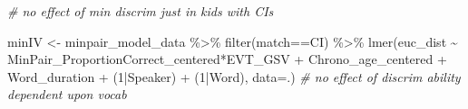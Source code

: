 \documentclass[
]{article}
\newenvironment{Shaded}{\begin{snugshade}}{\end{snugshade}}
\newcommand{\AttributeTok}[1]{\textcolor[rgb]{0.77,0.63,0.00}{#1}}
\newcommand{\CommentTok}[1]{\textcolor[rgb]{0.56,0.35,0.01}{\textit{#1}}}
\newcommand{\DecValTok}[1]{\textcolor[rgb]{0.00,0.00,0.81}{#1}}
\newcommand{\FunctionTok}[1]{\textcolor[rgb]{0.00,0.00,0.00}{#1}}
\newcommand{\NormalTok}[1]{#1}
\newcommand{\OtherTok}[1]{\textcolor[rgb]{0.56,0.35,0.01}{#1}}
\newcommand{\SpecialCharTok}[1]{\textcolor[rgb]{0.00,0.00,0.00}{#1}}
\newcommand{\StringTok}[1]{\textcolor[rgb]{0.31,0.60,0.02}{#1}}
\begin{document}
\begin{Shaded}
\begin{Highlighting}[]
\CommentTok{\# no effect of min discrim just in kids with CIs}

\NormalTok{minIV }\OtherTok{\textless{}{-}}\NormalTok{ minpair\_model\_data }\SpecialCharTok{\%\textgreater{}\%}
  \FunctionTok{filter}\NormalTok{(match}\SpecialCharTok{==}\StringTok{\textquotesingle{}CI\textquotesingle{}}\NormalTok{) }\SpecialCharTok{\%\textgreater{}\%}
  \FunctionTok{lmer}\NormalTok{(euc\_dist }\SpecialCharTok{\textasciitilde{}}\NormalTok{ MinPair\_ProportionCorrect\_centered}\SpecialCharTok{*}\NormalTok{EVT\_GSV }\SpecialCharTok{+} 
\NormalTok{         Chrono\_age\_centered }\SpecialCharTok{+} 
\NormalTok{         Word\_duration }\SpecialCharTok{+} 
\NormalTok{         (}\DecValTok{1}\SpecialCharTok{|}\NormalTok{Speaker) }\SpecialCharTok{+} 
\NormalTok{         (}\DecValTok{1}\SpecialCharTok{|}\NormalTok{Word), }
       \AttributeTok{data=}\NormalTok{.) }
\CommentTok{\# no effect of discrim ability dependent upon vocab}
\end{Highlighting}
\end{Shaded}
\end{document}
